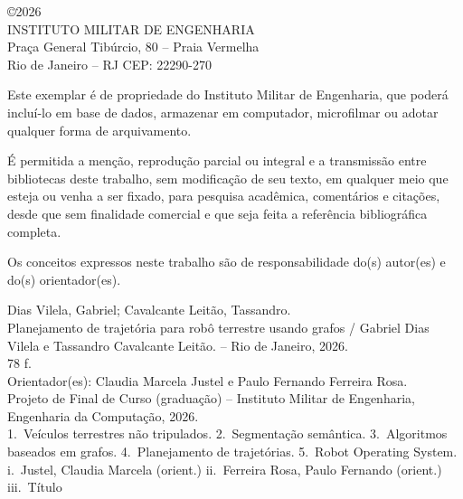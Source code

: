 \documentclass[
    12pt,
    openright,
    oneside,
    a4paper,
    english,
    brazil
]{abntex2}
\begin{document}
\begin{fichacatalografica}
    \vspace*{\fill}
    \begin{center}
    {\normalsize \copyright 2026\\
    INSTITUTO MILITAR DE ENGENHARIA\\
    Praça General Tibúrcio, 80 -- Praia Vermelha\\
    Rio de Janeiro -- RJ CEP: 22290-270}
    \end{center}

    \vspace{1cm}

    \noindent Este exemplar é de propriedade do Instituto Militar de Engenharia, que poderá incluí-lo em base de dados, armazenar em computador, microfilmar ou adotar qualquer forma de arquivamento.

    É permitida a menção, reprodução parcial ou integral e a transmissão entre bibliotecas deste trabalho, sem modificação de seu texto, em qualquer meio que esteja ou venha a ser fixado, para pesquisa acadêmica, comentários e citações, desde que sem finalidade comercial e que seja feita a referência bibliográfica completa.

    Os conceitos expressos neste trabalho são de responsabilidade do(s) autor(es) e do(s) orientador(es).

    \vspace{1cm}

    \noindent
    Dias Vilela, Gabriel; Cavalcante Leitão, Tassandro.\\
    Planejamento de trajetória para robô terrestre usando grafos / Gabriel Dias Vilela e Tassandro Cavalcante Leitão. -- Rio de Janeiro, 2026.\\
    78 f.\\[0.5em]
    Orientador(es): Claudia Marcela Justel e Paulo Fernando Ferreira Rosa.\\[0.5em]
    Projeto de Final de Curso (graduação) -- Instituto Militar de Engenharia, Engenharia da Computação, 2026.\\[0.5em]
    1.~Veículos terrestres não tripulados. 2.~Segmentação semântica. 3.~Algoritmos baseados em grafos. 4.~Planejamento de trajetórias. 5.~Robot Operating System. i.~Justel, Claudia Marcela (orient.) ii.~Ferreira Rosa, Paulo Fernando (orient.) iii.~Título
    \vspace*{\fill}
\end{fichacatalografica}
\end{document}
